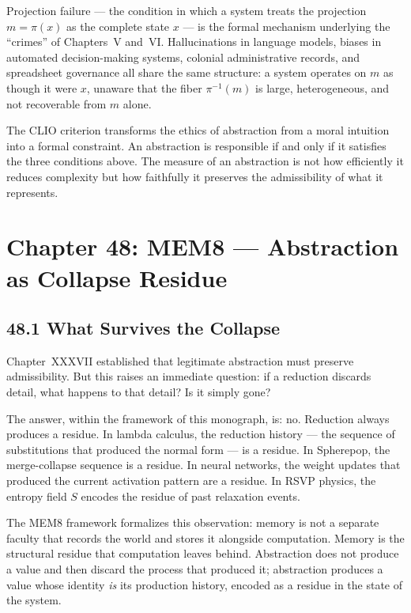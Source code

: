 \documentclass[12pt,letterpaper]{article}
\theoremstyle{remark}
\begin{document}
Projection failure — the condition in which a system treats the
projection $m = \pi(x)$ as the complete state $x$ — is the formal
mechanism underlying the ``crimes'' of Chapters~V and~VI.
Hallucinations in language models, biases in automated
decision-making systems, colonial administrative records, and
spreadsheet governance all share the same structure: a system
operates on $m$ as though it were $x$, unaware that the fiber
$\pi^{-1}(m)$ is large, heterogeneous, and not recoverable from
$m$ alone.

The CLIO criterion transforms the ethics of abstraction from a
moral intuition into a formal constraint. An abstraction is
responsible if and only if it satisfies the three conditions above.
The measure of an abstraction is not how efficiently it reduces
complexity but how faithfully it preserves the admissibility of
what it represents.

\newpage
\section{Chapter 48: MEM\textbar{}8 — Abstraction as Collapse Residue}

\subsection{48.1 What Survives the Collapse}

Chapter~XXXVII established that legitimate abstraction must preserve
admissibility. But this raises an immediate question: if a reduction
discards detail, what happens to that detail? Is it simply gone?

The answer, within the framework of this monograph, is: no.
Reduction always produces a residue. In lambda calculus, the
reduction history — the sequence of substitutions that produced the
normal form — is a residue. In Spherepop, the merge-collapse
sequence is a residue. In neural networks, the weight updates that
produced the current activation pattern are a residue. In RSVP
physics, the entropy field $S$ encodes the residue of past
relaxation events.

The MEM\textbar{}8 framework formalizes this observation: memory is
not a separate faculty that records the world and stores it
alongside computation. Memory is the structural residue that
computation leaves behind. Abstraction does not produce a value and
then discard the process that produced it; abstraction produces a
value whose identity \emph{is} its production history, encoded as
a residue in the state of the system.
\end{document}
